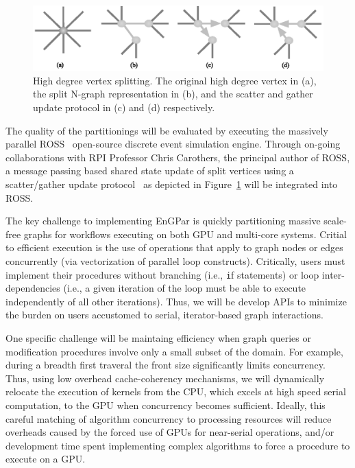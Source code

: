 \documentclass{article}
\begin{document}
\begin{figure}
  \includegraphics[width=\textwidth]{../ngraph/vtxSplitting.eps}
  \caption{\label{fig:vtxSplitting}
    High degree vertex splitting. 
    The original high degree vertex in (a), the split N-graph representation in
    (b), and the scatter and gather update protocol in (c) and (d) respectively.
  }
\end{figure}

The quality of the partitionings will be evaluated by executing the massively
parallel ROSS~\cite{carothers2002ross,mubarak2012modeling,barnes2013warp}
open-source discrete event simulation engine.
Through on-going collaborations with RPI Professor Chris Carothers, the principal
author of ROSS, a message passing based shared state update of split vertices
using a scatter/gather update
protocol~\cite{gonzalez2012powergraph,sahni2009scalable} as depicted in
Figure~\ref{fig:vtxSplitting} will be integrated into ROSS.

The key challenge to implementing EnGPar is quickly partitioning massive
scale-free graphs for workflows executing on both GPU and multi-core systems.
Critial to efficient execution is the use of operations that apply to graph
nodes or edges concurrently (via vectorization of parallel loop constructs).
Critically, users must implement their procedures without branching (i.e.,
{\texttt if} statements) or loop inter-dependencies
(i.e., a given iteration of the loop must be able to execute independently of
all other iterations).
Thus, we will be develop APIs to minimize the burden on users accustomed to
serial, iterator-based graph interactions.

One specific challenge will be maintaing efficiency when graph queries or
modification procedures involve only a small subset of the domain.
For example, during a breadth first traveral the front size significantly limits
concurrency.
Thus, using low overhead cache-coherency mechanisms, we will dynamically
relocate the execution of kernels from the CPU, which excels at high speed
serial computation, to the GPU when concurrency becomes sufficient.
Ideally, this careful matching of algorithm concurrency to processing resources
will reduce overheads caused by the forced use of GPUs for near-serial
operations, and/or development time spent implementing complex algorithms to
force a procedure to execute on a GPU.
\end{document}
